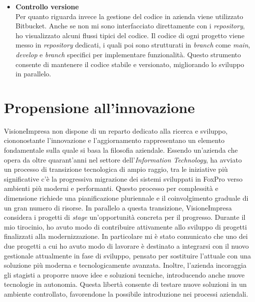 \begin{itemize}
    \item \textbf{Controllo versione} \\
    Per quanto riguarda invece la gestione del codice in azienda viene utilizzato Bitbucket. Anche se non mi sono interfacciato direttamente con i \textit{repository}, ho visualizzato alcuni flussi tipici del codice. Il codice di ogni progetto viene messo in \textit{repository} dedicati, i quali poi sono strutturati in \textit{branch} come \textit{main}, \textit{develop} e \textit{branch} specifici per implementare funzionalità.
    Questo strumento consente di mantenere il codice stabile e versionato, migliorando lo sviluppo in parallelo.
   
\end{itemize}

\section{Propensione all'innovazione}
\label{Propensione-all'-innovazione}
VisioneImpresa non dispone di un reparto dedicato alla ricerca e sviluppo, ciononostante l'innovazione e l'aggiornamento rappresentano un elemento fondamentale sulla quale si basa la filosofia aziendale. 
Essendo un'azienda che opera da oltre quarant'anni nel settore dell'\textit{Information Technology}, ha avviato un processo di transizione tecnologica di ampio raggio, tra le iniziative più significative c'è la progressiva migrazione dei sistemi  sviluppati in FoxPro verso ambienti più moderni e performanti. Questo processo per complessità e dimensione richiede una pianificazione pluriennale e il coinvolgimento graduale di un gran numero di risorse.
In parallelo a questa transizione, VisioneImpresa considera i progetti di \textit{stage} un'opportunità concreta per il progresso. Durante il mio tirocinio, ho avuto modo di contribuire attivamente allo sviluppo di progetti finalizzati alla modernizzazione. In particolare mi è stato comunicato che uno dei due progetti a cui ho avuto modo di lavorare è destinato a integrarsi con il nuovo gestionale attualmente in fase di sviluppo, pensato per sostituire l'attuale  con una soluzione più moderna e tecnologicamente avanzata.
Inoltre, l'azienda incoraggia gli stagisti a proporre nuove idee e soluzioni tecniche, introducendo anche nuove tecnologie in autonomia. Questa libertà consente di testare nuove soluzioni in un ambiente controllato, favorendone la possibile introduzione nei processi aziendali.

\newpage